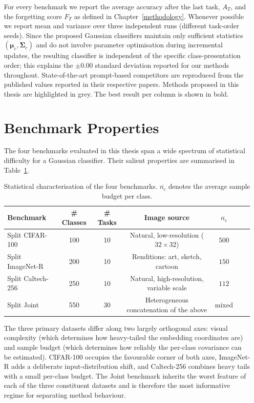 For every benchmark we report the average accuracy after the last task, $A_{T}$, and the forgetting score $F_{T}$ as defined in Chapter~\ref{methodology}. Whenever possible we report mean and variance over three independent runs (different task-order seeds). Since the proposed Gaussian classifiers maintain only sufficient statistics $(\boldsymbol{\mu}_c, \boldsymbol{\Sigma}_c)$ and do not involve parameter optimisation during incremental updates, the resulting classifier is independent of the specific class-presentation order; this explains the $\pm 0.00$ standard deviation reported for our methods throughout. State-of-the-art prompt-based competitors are reproduced from the published values reported in their respective papers. Methods proposed in this thesis are highlighted in grey. The best result per column is shown in bold.


\section{Benchmark Properties}
\label{sec:an:datasets}

The four benchmarks evaluated in this thesis span a wide spectrum of statistical difficulty for a Gaussian classifier. Their salient properties are summarised in Table~\ref{tab:dataset_summary}.

\begin{table}[htbp]
	\centering
	\caption{Statistical characterisation of the four benchmarks. $\overline{n_c}$ denotes the average sample budget per class.}
	\label{tab:dataset_summary}
	\scriptsize
	\setlength{\tabcolsep}{4pt}
	\begin{tabular}{lcccccc}
		\toprule
		\textbf{Benchmark} & \textbf{\# Classes} & \textbf{\# Tasks} & \textbf{Image source} & $\overline{n_c}$\\
		\midrule
		Split CIFAR-100   & 100 & 10 & Natural, low-resolution ($32{\times}32$)   & $500$    \\
		Split ImageNet-R  & 200 & 10 & Renditions: art, sketch, cartoon          & $150$     \\
		Split Caltech-256 & 250 & 10 & Natural, high-resolution, variable scale  & $112$  \\
		Split Joint       & 550 & 30 & Heterogeneous concatenation of the above  & mixed    \\
		\bottomrule
	\end{tabular}
\end{table}

The three primary datasets differ along two largely orthogonal axes: visual complexity (which determines how heavy-tailed the embedding coordinates are) and sample budget (which determines how reliably the per-class covariance can be estimated). CIFAR-100 occupies the favourable corner of both axes, ImageNet-R adds a deliberate input-distribution shift, and Caltech-256 combines heavy tails with a small per-class budget. The Joint benchmark inherits the worst feature of each of the three constituent datasets and is therefore the most informative regime for separating method behaviour.

